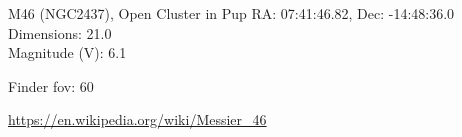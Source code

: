 \begin{block}{M46 (NGC2437), Open Cluster in Pup}
    RA: 07:41:46.82, Dec: -14:48:36.0 \\ 
    Dimensions: 21.0 \\ 
    Magnitude (V): 6.1



    Finder fov: 60 

    \url{https://en.wikipedia.org/wiki/Messier_46} 
\end{block}